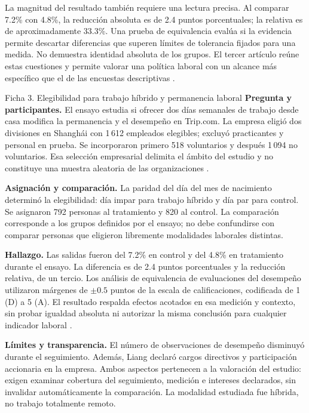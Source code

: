 {La magnitud del resultado también requiere una lectura precisa. Al comparar 7.2\% con 4.8\%, la reducción absoluta es de 2.4 puntos porcentuales; la relativa es de aproximadamente 33.3\%. Una prueba de equivalencia evalúa si la evidencia permite descartar diferencias que superen límites de tolerancia fijados para una medida. No demuestra identidad absoluta de los grupos. El tercer artículo reúne estas cuestiones y permite valorar una política laboral con un alcance más específico que el de las encuestas descriptivas \citep{bloom2024}.

\begin{fichainvestigacion}{Ficha 3. Elegibilidad para trabajo híbrido y permanencia laboral}
\textbf{Pregunta y participantes.} El ensayo estudia si ofrecer dos días semanales de trabajo desde casa modifica la permanencia y el desempeño en Trip.com. La empresa eligió dos divisiones en Shanghái con 1\,612 empleados elegibles; excluyó practicantes y personal en prueba. Se incorporaron primero 518 voluntarios y después 1\,094 no voluntarios. Esa selección empresarial delimita el ámbito del estudio y no constituye una muestra aleatoria de las organizaciones \citep{bloom2024}.

\textbf{Asignación y comparación.} La paridad del día del mes de nacimiento determinó la elegibilidad: día impar para trabajo híbrido y día par para control. Se asignaron 792 personas al tratamiento y 820 al control. La comparación corresponde a los grupos definidos por el ensayo; no debe confundirse con comparar personas que eligieron libremente modalidades laborales distintas.

\textbf{Hallazgo.} Las salidas fueron del 7.2\% en control y del 4.8\% en tratamiento durante el ensayo. La diferencia es de 2.4 puntos porcentuales y la reducción relativa, de un tercio. Los análisis de equivalencia de evaluaciones del desempeño utilizaron márgenes de $\pm0.5$ puntos de la escala de calificaciones, codificada de 1 (D) a 5 (A). El resultado respalda efectos acotados en esa medición y contexto, sin probar igualdad absoluta ni autorizar la misma conclusión para cualquier indicador laboral \citep{bloom2024}.

\textbf{Límites y transparencia.} El número de observaciones de desempeño disminuyó durante el seguimiento. Además, Liang declaró cargos directivos y participación accionaria en la empresa. Ambos aspectos pertenecen a la valoración del estudio: exigen examinar cobertura del seguimiento, medición e intereses declarados, sin invalidar automáticamente la comparación. La modalidad estudiada fue híbrida, no trabajo totalmente remoto.


\end{fichainvestigacion}}
